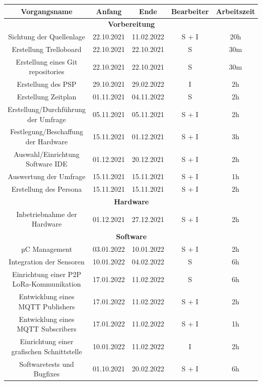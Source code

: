\begin{adjustwidth}{-1in}{-1in}%
	\begin{center}
		\begin{tabular}{ ccccc }
			\toprule
			{Vorgangsname} & {Anfang} & {Ende} & {Bearbeiter} & {Arbeitszeit}\\

			\midrule
			\multicolumn{5}{c}{\textbf{Vorbereitung}} \\
			{Sichtung der Quellenlage} & {22.10.2021} & {11.02.2022} & S + I & 20h\\
			{Erstellung Trelloboard} & {22.10.2021} & {22.10.2021} & S & 30m\\
			{Erstellung eines Git repositories} & {22.10.2021} & {22.10.2021} & S & 30m\\
			{Erstellung des PSP} & {29.10.2021} & {29.02.2022} & I & 2h\\
			{Erstellung Zeitplan} & {01.11.2021} & {04.11.2022} & S & 2h\\
			{Erstellung/Durchführung der Umfrage} & {05.11.2021} & {05.11.2021} & S + I & 2h\\
			{Festlegung/Beschaffung der Hardware} & {15.11.2021} & {01.12.2021} & S + I & 3h\\
			{Auswahl/Einrichtung Software IDE} & {01.12.2021} & {20.12.2021} & S + I & 2h\\
			{Auswertung der Umfrage} & {15.11.2021} & {15.11.2021} & S + I & 1h\\
			{Erstellung des Persona} & {15.11.2021} & {15.11.2021} & S + I & 2h\\

			\midrule
			\multicolumn{5}{c}{\textbf{Hardware}} \\
			{Inbetriebnahme der Hardware} & {01.12.2021} & {27.12.2021} & S + I & 2h\\

			\midrule
			\multicolumn{5}{c}{\textbf{Software}} \\
			{µC Management} & {03.01.2022} & {10.01.2022} & S + I & 2h\\
			{Integration der Sensoren} & {10.01.2022} & {04.02.2022} & S & 6h\\
			{Einrichtung einer P2P LoRa-Kommunikation} & {17.01.2022} & {11.02.2022} & S & 6h\\
			{Entwicklung eines MQTT Publishers} & {17.01.2022} & {11.02.2022} & S + I & 2h\\
			{Entwicklung eines MQTT Subscribers} & {17.01.2022} & {11.02.2022} & S + I & 1h\\
			{Einrichtung einer grafischen Schnittstelle} & {10.01.2022} & {11.02.2022} &  I & 2h\\
			{Softwaretests und Bugfixes} & {01.10.2021} & {20.02.2022} & S + I & 6h\\


\end{tabular}
\end{center}
\end{adjustwidth}
